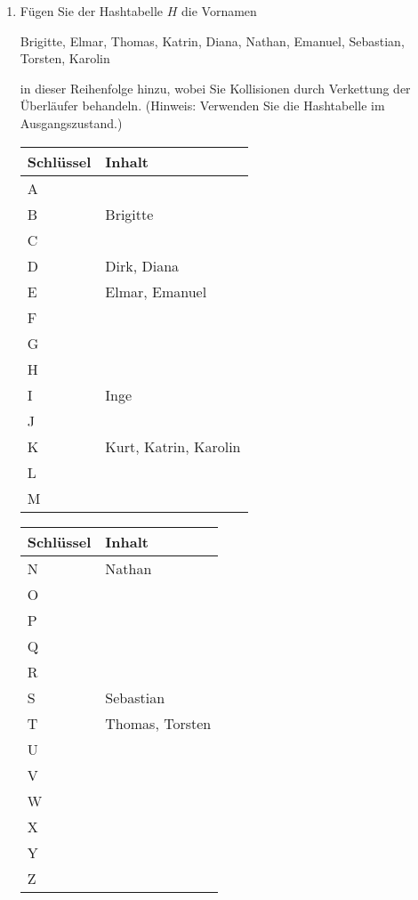 \documentclass{bschlangaul-aufgabe}
\begin{document}
\begin{enumerate}

\item Fügen Sie der Hashtabelle $H$ die Vornamen

\begin{center}
Brigitte, Elmar, Thomas, Katrin, Diana, Nathan, Emanuel, Sebastian,
Torsten, Karolin
\end{center}

in dieser Reihenfolge hinzu, wobei Sie Kollisionen durch Verkettung der
Überläufer behandeln. (Hinweis: Verwenden Sie die Hashtabelle im
Ausgangszustand.)

\begin{bAntwort}
\begin{multicols}{2}
\noindent
\begin{tabularx}{\linewidth}{|l||X|}
\hline
Schlüssel & Inhalt \\\hline\hline
A &\\\hline
B & Brigitte \\\hline
C &\\\hline
D & Dirk, Diana \\\hline
E & Elmar, Emanuel \\\hline
F &\\\hline
G &\\\hline
H &\\\hline
I & Inge \\\hline
J &\\\hline
K & Kurt, Katrin, Karolin \\\hline
L &\\\hline
M &\\\hline
\end{tabularx}

\noindent
\begin{tabularx}{\linewidth}{|l||X|}
\hline
Schlüssel & Inhalt \\\hline\hline
N & Nathan \\\hline
O & \\\hline
P & \\\hline
Q & \\\hline
R & \\\hline
S & Sebastian \\\hline
T & Thomas, Torsten \\\hline
U & \\\hline
V & \\\hline
W & \\\hline
X & \\\hline
Y & \\\hline
Z & \\\hline
\end{tabularx}
\end{multicols}
\bigskip
\end{bAntwort}

\end{enumerate}
\end{document}
